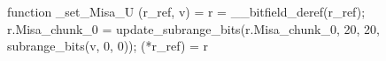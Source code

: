 function _set_Misa_U (r_ref, v) = {
    r = __bitfield_deref(r_ref);
    r.Misa_chunk_0 = update_subrange_bits(r.Misa_chunk_0, 20, 20, subrange_bits(v, 0, 0));
    (*r_ref) = r
}
